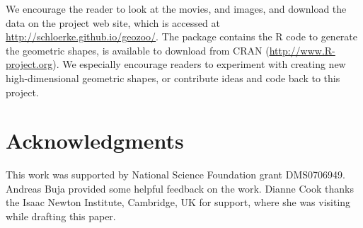 We encourage the reader to look at the movies, and images, and
download the data on the project web site, which is accessed at \url{http://schloerke.github.io/geozoo/}. The 
package contains the R code to generate the geometric shapes, is
available to download from CRAN (\url{http://www.R-project.org}). We
especially encourage readers to experiment with creating new
high-dimensional geometric shapes, or contribute ideas and code back to this project.

\section{Acknowledgments}

This work was supported by National Science Foundation grant
DMS0706949. Andreas Buja provided some helpful feedback on the
work. Dianne Cook thanks the Isaac Newton Institute, Cambridge, UK for
support, where she was visiting while drafting this paper.



\address{Barret Schloerke\\
  Department of Statistics \\
  Purdue University \\
  250 N. University Street\\
  West Lafayette, IN 47907\\
  USA} \\

\address{Hadley Wickham\\
  RStudio Inc} \\

\address{Dianne Cook\\
  Department of Econometrics and Business Statistics\\
  Monash University\\
  Wellington Road \\
  Clayton, Victoria 3800\\
  Australia}\\

\address{Heike Hofmann\\
  Department of Statistics\\
  Iowa State University \\
  Snedecor Hall \\
  Ames, Iowa 50011\\
  USA}\\
